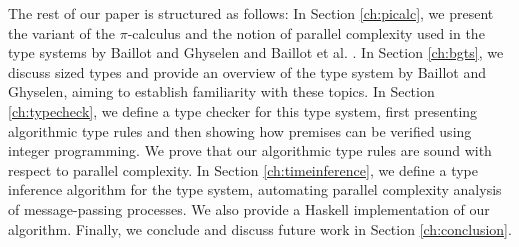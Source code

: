 The rest of our paper is structured as follows: In Section \ref{ch:picalc}, we present the variant of the $\pi$-calculus and the notion of parallel complexity used in the type systems by Baillot and Ghyselen \cite{BaillotGhyselen2021} and Baillot et al. \cite{BaillotEtAl2021}. In Section \ref{ch:bgts}, we discuss sized types and provide an overview of the type system by Baillot and Ghyselen, aiming to establish familiarity with these topics. In Section \ref{ch:typecheck}, we define a type checker for this type system, first presenting algorithmic type rules and then showing how premises can be verified using integer programming. We prove that our algorithmic type rules are sound with respect to parallel complexity. In Section \ref{ch:timeinference}, we define a type inference algorithm for the type system, automating parallel complexity analysis of message-passing processes. We also provide a Haskell implementation of our algorithm. Finally, we conclude and discuss future work in Section \ref{ch:conclusion}.

